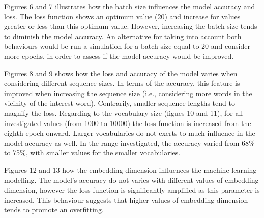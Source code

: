\documentclass{article}
\begin{document}
Figures 6 and 7 illustrates how the batch size influences the model accuracy and loss. The loss function shows an optimum value (20) and increase for values greater or less than this optimum value. However, increasing the batch size tends to diminish the model accuracy. An alternative for taking into account both behaviours would be run a simulation for a batch size equal to 20 and consider more epochs, in order to assess if the model accuracy would be improved.

Figures 8 and 9 shows how the loss and accuracy of the model varies when considering different sequence sizes. In terms of the accuracy, this feature is improved when increasing the sequence size (i.e., considering more words in the vicinity of the interest word). Contrarily, smaller sequence lengths tend to magnify the loss. Regarding to the vocabulary size (figues 10 and 11), for all investigated values (from 1000 to 10000) the loss function is increased from the eighth epoch onward. Larger vocabularies do not exerts to much influence in the model accuracy as well. In the range investigated, the accuracy varied from 68\% to 75\%, with smaller values for the smaller vocabularies.

Figures 12 and 13 how the embedding dimension influences the machine learning modelling. The model's accuracy do not varies with different values of embedding dimension, however the loss function is significantly amplified as this parameter is increased. This behaviour suggests that higher values of embedding dimension tends to promote an overfitting. 
\end{document}
